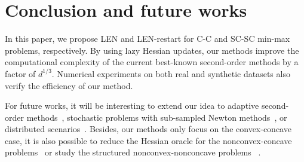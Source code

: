 \documentclass{article}
\theoremstyle{plain}
\begin{document}
\section{Conclusion and future works}
\label{sec:conclu}
In this paper, we propose LEN and LEN-restart for C-C and SC-SC min-max problems, respectively. By using lazy Hessian updates, our methods improve the computational complexity of the current best-known second-order methods 
by a factor of $d^{1/3}$.  
Numerical experiments on both real and synthetic datasets also verify the efficiency of our method. 











For future works, it will be interesting to extend our idea to adaptive second-order methods~\citep{wang2024fully,doikov2024super,carmon2022optimal,antonakopoulos2022extra,liu2022regularized}, stochastic problems with sub-sampled Newton methods~\citep{lin2022explicit,chayti2023unified,zhou2019stochastic,tripuraneni2018stochastic,wang2019stochastic}, or distributed scenarios~\cite{liu2023communication}. 
Besides, our methods only focus on the convex-concave case, it is also possible to reduce the Hessian oracle for the nonconvex-concave problems~\citep{luo2022finding,lin2020near,yang2023accelerating,zhang2022sapd+,wang2024efficient} or study the structured nonconvex-nonconcave problems
~\citep{zheng2024universal,diakonikolas2021efficient,yang2020global,lee2021fast,chen2022near}. 
\end{document}
